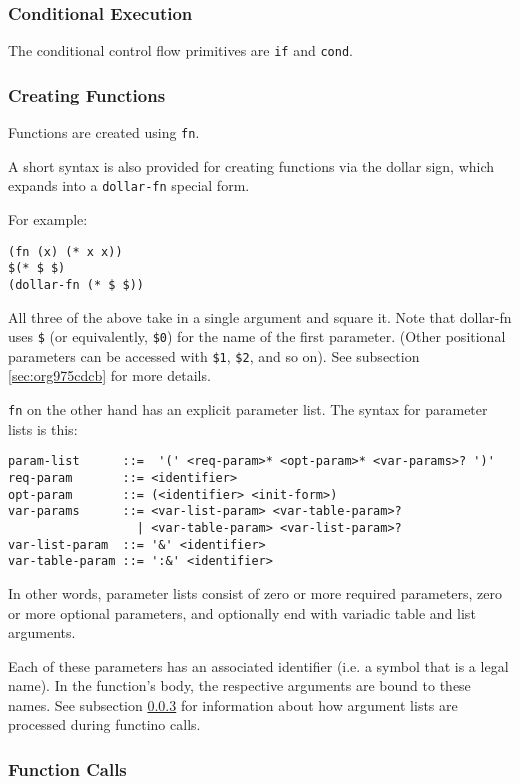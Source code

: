 \documentclass[11pt]{article}
\begin{document}
\subsubsection{Conditional Execution}
\label{sec:org0a9ff87}

The conditional control flow primitives are \texttt{if} and \texttt{cond}.


\subsubsection{Creating Functions}
\label{sec:org87d2bc1}

Functions are created using \texttt{fn}.

A short syntax is also provided for creating functions via the dollar sign,
which expands into a \texttt{dollar-fn} special form.

For example:
\begin{verbatim}
(fn (x) (* x x))
$(* $ $)
(dollar-fn (* $ $))
\end{verbatim}

All three of the above take in a single argument and square it. Note that
dollar-fn uses \texttt{\$} (or equivalently, \texttt{\$0}) for the name of the first parameter.
(Other positional parameters can be accessed with \texttt{\$1}, \texttt{\$2}, and so on). See
subsection \ref{sec:org975cdcb} for more details.

\texttt{fn} on the other hand has an explicit parameter list. The syntax for parameter
lists is this:
\begin{verbatim}
param-list      ::=  '(' <req-param>* <opt-param>* <var-params>? ')'
req-param       ::= <identifier>
opt-param       ::= (<identifier> <init-form>)
var-params      ::= <var-list-param> <var-table-param>?
                  | <var-table-param> <var-list-param>?
var-list-param  ::= '&' <identifier>
var-table-param ::= ':&' <identifier>
\end{verbatim}

In other words, parameter lists consist of zero or more required parameters,
zero or more optional parameters, and optionally end with variadic table and
list arguments.

Each of these parameters has an associated identifier (i.e. a symbol that is a
legal name). In the function's body, the respective arguments are bound to these
names. See subsection \ref{sec:org8352aea} for information about how argument lists
are processed during functino calls.


\subsubsection{Function Calls}
\label{sec:org8352aea}
\end{document}
